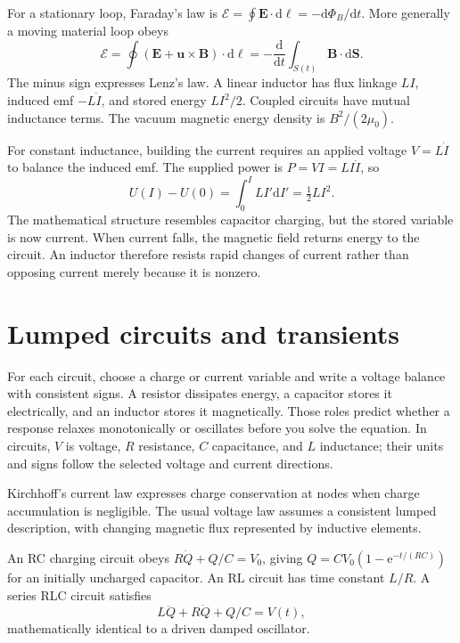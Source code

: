 \documentclass[11pt,oneside]{book}
\newcommand{\dd}{\mathrm{d}}
\newcommand{\ee}{\mathrm{e}}
\newcommand{\vect}[1]{\boldsymbol{#1}}
\newcommand{\od}[2]{\frac{\dd #1}{\dd #2}}
\newcommand{\mun}{\mu_0}
\theoremstyle{reviewstyle}
\begin{document}
For a stationary loop, Faraday's law is $\mathcal E=\oint\vect E\cdot\dd\vect\ell=-\dd\Phi_B/\dd t$. More generally a moving material loop obeys
\begin{equation}\mathcal E=\oint(\vect E+\vect u\times\vect B)\cdot\dd\vect\ell=-\od{}{t}\int_{S(t)}\vect B\cdot\dd\vect S.\end{equation}
The minus sign expresses Lenz's law. A linear inductor has flux linkage $LI$, induced emf $-L\dot I$, and stored energy $LI^2/2$. Coupled circuits have mutual inductance terms. The vacuum magnetic energy density is $B^2/(2\mun)$.

For constant inductance, building the current requires an applied voltage $V=L\dot I$ to balance the induced emf. The supplied power is $P=VI=LI\dot I$, so
\begin{equation}
U(I)-U(0)=\int_0^I LI'\dd I'=\tfrac12LI^2.
\end{equation}
The mathematical structure resembles capacitor charging, but the stored variable is now current. When current falls, the magnetic field returns energy to the circuit. An inductor therefore resists rapid changes of current rather than opposing current merely because it is nonzero.

\section{Lumped circuits and transients}
For each circuit, choose a charge or current variable and write a voltage balance with consistent signs. A resistor dissipates energy, a capacitor stores it electrically, and an inductor stores it magnetically. Those roles predict whether a response relaxes monotonically or oscillates before you solve the equation. In circuits, $V$ is voltage, $R$ resistance, $C$ capacitance, and $L$ inductance; their units and signs follow the selected voltage and current directions.

Kirchhoff's current law expresses charge conservation at nodes when charge accumulation is negligible. The usual voltage law assumes a consistent lumped description, with changing magnetic flux represented by inductive elements.

An RC charging circuit obeys $R\dot Q+Q/C=V_0$, giving
$Q=CV_0(1-\ee^{-t/(RC)})$ for an initially uncharged capacitor. An RL circuit has time constant $L/R$. A series RLC circuit satisfies
\begin{equation}L\ddot Q+R\dot Q+Q/C=V(t),\end{equation}
mathematically identical to a driven damped oscillator.
\end{document}
